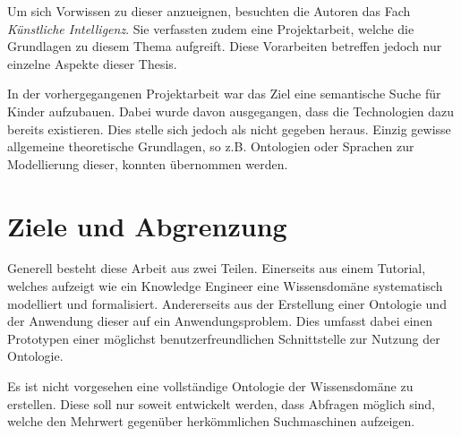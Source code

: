 Um sich Vorwissen zu dieser anzueignen, besuchten die Autoren das Fach \textit{Künstliche Intelligenz}. Sie verfassten zudem eine Projektarbeit, welche die Grundlagen zu diesem Thema aufgreift. Diese Vorarbeiten betreffen jedoch nur einzelne Aspekte dieser Thesis.

In der vorhergegangenen Projektarbeit war das Ziel eine semantische Suche für Kinder aufzubauen. Dabei wurde davon ausgegangen, dass die Technologien dazu bereits existieren. Dies stelle sich jedoch als nicht gegeben heraus. Einzig gewisse allgemeine theoretische Grundlagen, so z.B. Ontologien oder Sprachen zur Modellierung dieser, konnten übernommen werden.

\section{Ziele und Abgrenzung}
\label{sec:aufgabe_ziele}
Generell besteht diese Arbeit aus zwei Teilen. Einerseits aus einem  Tutorial, welches aufzeigt wie ein Knowledge Engineer eine Wissensdomäne systematisch modelliert und formalisiert. Andererseits aus der Erstellung einer Ontologie und der Anwendung dieser auf ein Anwendungsproblem. Dies umfasst dabei einen Prototypen einer möglichst benutzerfreundlichen Schnittstelle zur Nutzung der Ontologie.

Es ist nicht vorgesehen eine vollständige Ontologie der Wissensdomäne zu erstellen. Diese soll nur soweit entwickelt werden, dass Abfragen möglich sind, welche den Mehrwert gegenüber herkömmlichen Suchmaschinen aufzeigen.
